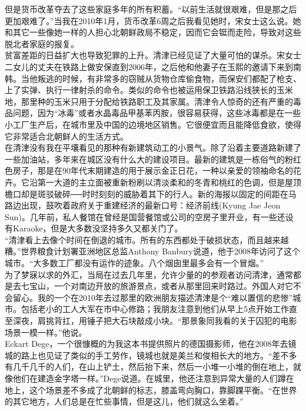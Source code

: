 \begin{multicols}{\theparacolNo}
但是货币改革夺去了这些家庭多年的所有积蓄。“以前生活就很艰难，但是那之后更加艰难了。”当我在2010年1月，货币改革6周之后我看见她时，宋女士这么说。她和其它一些像她一样的人担心北朝鲜政局不稳定，因而它会铤而走险，导致对这些脱北者家庭的报复。\\

贫富差距的日益扩大也导致犯罪的上升。清津已经见证了大量可怕的谋杀。宋女士二女儿的丈夫在铁路上做安保直到2006年，之后他和他妻子在玉熙的邀请下来到南韩。当他叛逃的时候，有非常多的窃贼从货物仓库偷食物，而保安们都配了枪支、上了实弹、执行一律射杀的命令。类似的命令也被运用保卫铁路沿线狭长的玉米地，那里种的玉米只用于分配给铁路职工及其家属。清津令人惊奇的还有严重的毒品问题，因为“冰毒”或者水晶毒品甲基苯丙胺，很容易获得，这些冰毒都是在一些小工厂生产后，在城市里及中国的边境地区销售。它很便宜而且能降低食欲，使得它非常适合北朝鲜人的生活方式。\\

在清津没有我在平壤看见的那种有新建筑动工的小景气。除了沿着主要道路新建了一些加油站，多年来在城区没有什么大的建设项目。最新的建筑是一栋俗气的粉红色房子，那是在90年代末期建造的用于展示金正日花，一种以亲爱的领袖命名的花卉。它沿第一大道的主立面被重新粉刷以清淡柔和的冬青和桃红的色调，但是屋顶檐口却是斑驳破碎──时时刻刻的威胁着其下的行人。新的海报以固定的间距在马路边出现，鼓吹着政府关于重建经济的最新口号：经济前线(Kyung Jae Jeon Sun)。几年前，私人餐馆在曾经是国营餐馆或公司的空房子里开业，有一些还设有Karaoke，但是大多数没坚持多久又都关门了。\\

“清津看上去像个时间在倒退的城市。所有的东西都处于破损状态，而且越来越糟。”世界粮食计划署亚洲地区总监Anthony Banbury说道，他于2008年访问了这个城市。“大多数工厂都没有运作的迹象。八个烟囱里最多会有一个冒烟。”\\

为了梦寐以求的外汇，当局在过去几年里，允许少量的的参观者访问清津，通常都是去七宝山，一个对南边开放的旅游景点，或者从那里回来时路过。外国人对它不会留心。我的一个在2010年去过那里的欧洲朋友描述清津是个“难以置信的悲惨”城市。包括老小的工人大军在市中心修路；我朋友注意到他们从早上5点开始工作直至深夜，肩挑背扛，用锤子把大石块敲成小块。“那景象同我看的关于囚犯的电影场景一模一样。”他说。\\

Eckart Dege，一个很慷概的为我这本书提供照片的德国摄影师，他在2008年去镜城的路上也见证了类似的手工劳作，镜城也就是美兰和俊相长大的地方。“差不多有几千几千的人们，在山上铲土，然后抬下来，然后一小堆一小堆的倒在地上，就像他们在建造金字塔一样。”Dege说道。在城里，他还注意到异常大量的人们蹲在地上，这个场景差不多成了北朝鲜的标志，膝盖弯向胸口，靠脚踝平衡。“在世界的其它地方，人们总是在忙些事情，但是这儿，他们就这么坐着。”\\


\end{multicols}
